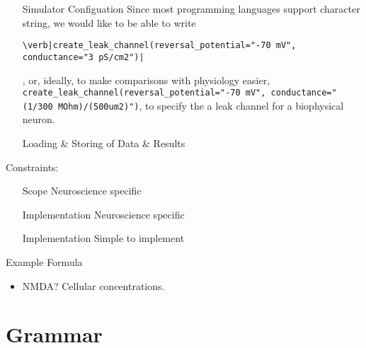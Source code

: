 \documentclass{article}
\begin{document}
\begin{itemize}
\item[Simulator Configuation]   
Since most programming languages support character string, we would like to be able to write
\begin{lstlisting}
\verb|create_leak_channel(reversal_potential="-70 mV", conductance="3 pS/cm2")|
\end{lstlisting}
, or, ideally, to make comparisons with physiology easier, \verb|create_leak_channel(reversal_potential="-70 mV", conductance=" (1/300 MOhm)/(500um2)")|, to specify the a leak channel for a biophysical neuron.

\item[Loading \& Storing of Data \& Results]


\end{itemize}


Constraints:
\begin{itemize}
\item[Scope] Neuroscience specific 
\item[Implementation] Neuroscience specific 
\item[Implementation] Simple to implement
\end{itemize}

Example Formula
\begin{itemize}
\item NMDA? Cellular concentrations.
\end{itemize}



\section{Grammar}
\end{document}
